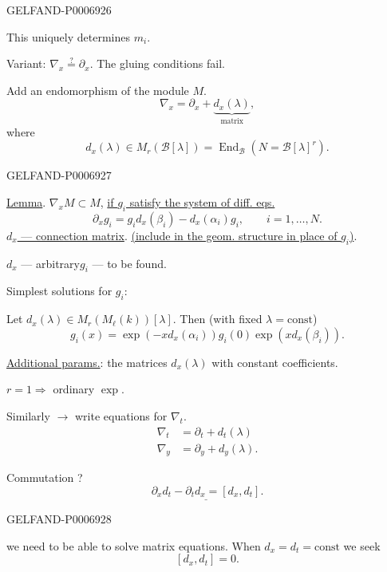 \begin{GelfandAdjacentEvidence}{GELFAND-P000692}{6}

This uniquely determines \(m_i\).

Variant: \(\nabla_x\overset{?}{=}\partial_x\).
The gluing conditions fail.

Add an endomorphism of the module \(M\).
\[
\nabla_x=\partial_x+\underbrace{d_x(\lambda)}_{\text{matrix}},
\]
where
\[
d_x(\lambda)\in M_r(\mathcal B[\lambda])
=\operatorname{End}_{\mathcal B}(N=\mathcal B[\lambda]^r).
\]
\end{GelfandAdjacentEvidence}
\begin{GelfandAdjacentEvidence}{GELFAND-P000692}{7}


\underline{Lemma}. \(\nabla_x M\subset M\), \underline{if \(g_i\) satisfy the system of diff. eqs.}
\[
\partial_xg_i=g_i d_x(\beta_i)-d_x(\alpha_i)g_i,\qquad i=1,\ldots,N.
\]
\underline{\(d_x\) --- connection matrix}. \underline{(include in the geom. structure in place of \(g_i\))}.

\(d_x\) --- arbitrary\qquad \(g_i\) --- to be found.

Simplest solutions for \(g_i\):

Let \(d_x(\lambda)\in M_r(M_\ell(k))[\lambda]\). Then
(with fixed \(\lambda=\mathrm{const}\))
\[
g_i(x)=\exp(-x d_x(\alpha_i))g_i(0)\exp(x d_x(\beta_i)).
\]

\underline{Additional params.}: the matrices \(d_x(\lambda)\) with constant coefficients.

\(r=1\Rightarrow\) ordinary \(\exp\).

Similarly \(\rightarrow\) write equations for \(\nabla_t\).
\[
\begin{aligned}
\nabla_t&=\partial_t+d_t(\lambda)\\
\nabla_y&=\partial_y+d_y(\lambda).
\end{aligned}
\]

Commutation ?
\[
\underline{\partial_xd_t-\partial_td_x=[d_x,d_t]}.
\]
\end{GelfandAdjacentEvidence}
\begin{GelfandAdjacentEvidence}{GELFAND-P000692}{8}


we need to be able to solve matrix equations. When \(d_x=d_t=\mathrm{const}\) we seek
\[
[d_x,d_t]=0.
\]
\end{GelfandAdjacentEvidence}
